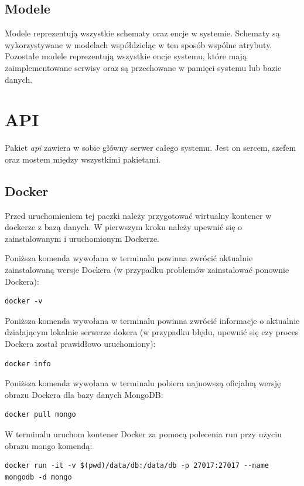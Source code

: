 \subsection{Modele}
Modele reprezentują wszystkie schematy oraz encje w systemie.
Schematy są wykorzystywane w modelach współdzieląc w ten sposób wspólne atrybuty. Pozostałe modele reprezentują wszystkie encje systemu, które mają zaimplementowane serwisy oraz są przechowane w pamięci systemu lub bazie danych.

\section{API}
Pakiet \textit{api} zawiera w sobie główny serwer całego systemu. Jest on sercem, szefem oraz mostem między wszystkimi pakietami.

\subsection{Docker}
Przed uruchomieniem tej paczki należy przygotować wirtualny kontener w dockerze z bazą danych. W pierwszym kroku należy upewnić się o zainstalowanym i uruchomionym Dockerze.

Poniższa komenda wywołana w terminalu powinna zwrócić aktualnie zainstalowaną wersje Dockera (w przypadku problemów zainstalować ponownie Dockera):
\begin{lstlisting}
docker -v
\end{lstlisting}

Poniższa komenda wywołana w terminalu powinna zwrócić informacje o aktualnie działającym lokalnie serwerze dokera (w przypadku błędu, upewnić się czy proces Dockera został prawidłowo uruchomiony):
\begin{lstlisting}
docker info
\end{lstlisting}

Poniższa komenda wywołana w terminalu pobiera najnowszą oficjalną wersję obrazu Dockera dla bazy danych MongoDB:

\begin{lstlisting}
docker pull mongo
\end{lstlisting}

W terminalu uruchom kontener Docker za pomocą polecenia run przy użyciu obrazu mongo komendą:

\begin{lstlisting}[breaklines=true]
docker run -it -v $(pwd)/data/db:/data/db -p 27017:27017 --name mongodb -d mongo
\end{lstlisting}

